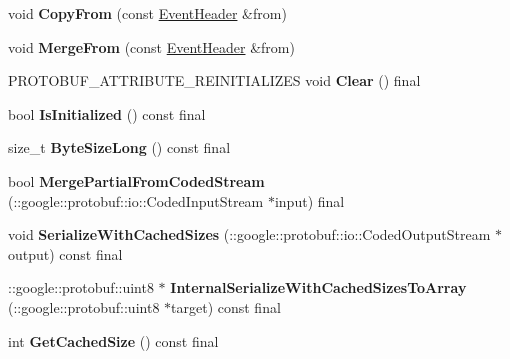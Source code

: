 \begin{DoxyCompactItemize}
void {\bfseries Copy\+From} (const \hyperlink{classtbMessages_1_1EventHeader}{Event\+Header} \&from)
\item 
\mbox{\label{classtbMessages_1_1EventHeader_a520c2e734344e515ee034f11ce66b95c}} 
void {\bfseries Merge\+From} (const \hyperlink{classtbMessages_1_1EventHeader}{Event\+Header} \&from)
\item 
\mbox{\label{classtbMessages_1_1EventHeader_ac63895e2fa84d4244d727431c621bd26}} 
P\+R\+O\+T\+O\+B\+U\+F\+\_\+\+A\+T\+T\+R\+I\+B\+U\+T\+E\+\_\+\+R\+E\+I\+N\+I\+T\+I\+A\+L\+I\+Z\+ES void {\bfseries Clear} () final
\item 
\mbox{\label{classtbMessages_1_1EventHeader_aa3c5bbdd6a225251d7832f1ae953aa37}} 
bool {\bfseries Is\+Initialized} () const final
\item 
\mbox{\label{classtbMessages_1_1EventHeader_abce3a7782847370045c64d7c0f3052e4}} 
size\+\_\+t {\bfseries Byte\+Size\+Long} () const final
\item 
\mbox{\label{classtbMessages_1_1EventHeader_ace229166ac64a34a9673581354d7bd7a}} 
bool {\bfseries Merge\+Partial\+From\+Coded\+Stream} (\+::google\+::protobuf\+::io\+::\+Coded\+Input\+Stream $\ast$input) final
\item 
\mbox{\label{classtbMessages_1_1EventHeader_a0d4efb9e81d34df4262bfbc28b8212d5}} 
void {\bfseries Serialize\+With\+Cached\+Sizes} (\+::google\+::protobuf\+::io\+::\+Coded\+Output\+Stream $\ast$output) const final
\item 
\mbox{\label{classtbMessages_1_1EventHeader_a9dd7be02a38c7e494e682f6dd68584bf}} 
\+::google\+::protobuf\+::uint8 $\ast$ {\bfseries Internal\+Serialize\+With\+Cached\+Sizes\+To\+Array} (\+::google\+::protobuf\+::uint8 $\ast$target) const final
\item 
\mbox{\label{classtbMessages_1_1EventHeader_a430fb7822628cbfd7b385ffe01e85019}} 
int {\bfseries Get\+Cached\+Size} () const final
\item 

\end{DoxyCompactItemize}
